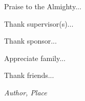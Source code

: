 \begin{acknowledgement}
Praise to the Almighty...

Thank supervisor(s)...

Thank sponsor...

Appreciate family...

Thank friends...

\begin{flushright}
\textit{Author, Place}
\end{flushright}
\end{acknowledgement}
